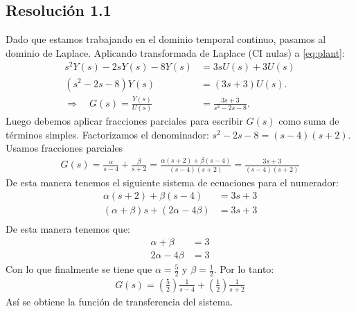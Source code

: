 \documentclass[
  11pt,
  letterpaper,
   addpoints,
   answers
  ]{exam}
\begin{document}
\begin{questions}
\begin{solution}
  \subsection*{Resolución 1.1}
  Dado que estamos trabajando en el dominio temporal continuo, pasamos al dominio de Laplace. Aplicando transformada de Laplace (CI nulas) a \eqref{eq:plant}:
  \begin{align}
      s^2 Y(s) - 2s Y(s) - 8 Y(s) &= 3s U(s) + 3 U(s) \nonumber \\
      (s^2 - 2s - 8)Y(s) &= (3s + 3)U(s). \label{eq:plant_laplace}\\
      \Longrightarrow \quad G(s)=\frac{Y(s)}{U(s)} &= \frac{3s+3}{s^{2}-2s-8}. \nonumber
  \end{align}
Luego debemos aplicar fracciones parciales para escribir $G(s)$ como suma de términos simples. Factorizamos el denominador: $s^{2}-2s-8 = (s-4)(s+2)$. Usamos fracciones parciales
\begin{align}
      G(s)=\frac{\alpha}{s-4}+\frac{\beta}{s+2} = \frac{\alpha(s+2)+\beta(s-4)}{(s-4)(s+2)}= \frac{3s+3}{(s-4)(s+2)}
\end{align}
De esta manera tenemos el siguiente sistema de ecuaciones para el numerador:
\begin{align}
  \alpha(s+2)+\beta(s-4) &= 3s+3 \nonumber \\
  (\alpha+\beta)s + (2\alpha - 4\beta) &= 3s + 3 \nonumber \\
\end{align}
De esta manera tenemos que:
\begin{align}
  \alpha + \beta &= 3 \label{eq:sistema1} \\
  2\alpha - 4\beta &= 3 \label{eq:sistema2}
\end{align}
Con lo que finalmente se tiene que $\alpha = \tfrac{5}{2}$ y $\beta = \tfrac{1}{2}$. Por lo tanto:
\begin{align}
  G(s) = \left(\frac{5}{2}\right)\frac{1}{s-4} + \left(\frac{1}{2}\right)\frac{1}{s+2}
\end{align}
Así se obtiene la función de transferencia del sistema.


\end{solution}
\end{questions}
\end{document}
